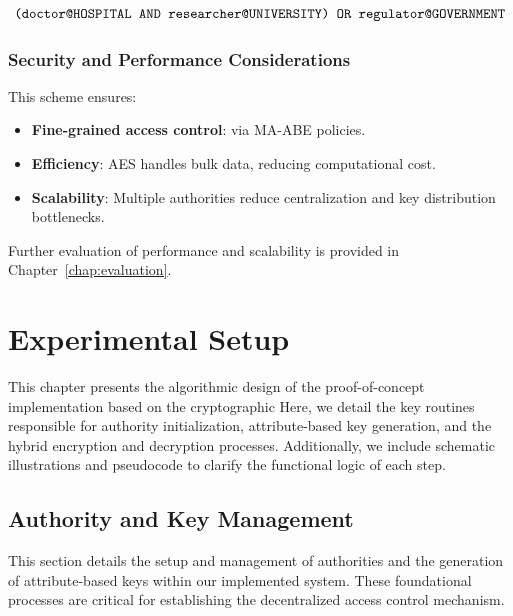 \documentclass[cic,tc,english]{iiufrgs}
\begin{document}
            \begin{equation}
                \label{eq:policy_example}
                \texttt{(\allowbreak doctor@HOSPITAL \allowbreak AND \allowbreak researcher@UNIVERSITY) \allowbreak OR \allowbreak regulator@GOVERNMENT}
            \end{equation}


        \subsection{Security and Performance Considerations}
            This scheme ensures:
            \begin{itemize}
            \item \textbf{Fine-grained access control}: via MA-ABE policies.
            \item \textbf{Efficiency}: AES handles bulk data, reducing computational cost.
            \item \textbf{Scalability}: Multiple authorities reduce centralization and key distribution bottlenecks.
            \end{itemize}

            Further evaluation of performance and scalability is provided in Chapter~\ref{chap:evaluation}.


\chapter{Experimental Setup}
\label{chap:experimentalsetup}

    This chapter presents the algorithmic design of the proof-of-concept implementation based on the cryptographic Here, we detail the key routines responsible for authority initialization, attribute-based key generation, and the hybrid encryption and decryption processes. Additionally, we include schematic illustrations and pseudocode to clarify the functional logic of each step.

    \section{Authority and Key Management}
    \label{sec:authority-key-management}

        This section details the setup and management of authorities and the generation of attribute-based keys within our implemented system. These foundational processes are critical for establishing the decentralized access control mechanism.
\end{document}
